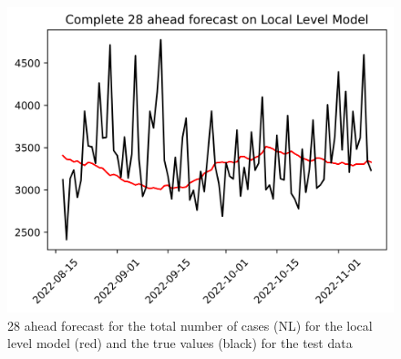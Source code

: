 \begin{figure}
\begin{minipage}{.32\textwidth}
  \label{fig:tot_cases_fc_7_mix_DE}
\end{minipage}
\begin{minipage}{.32\textwidth}
  \centering
  \includegraphics[width=\linewidth]{pics/28_ah/Complete_28_ahead_Local Level Model.png}
  \caption{28 ahead forecast for the total number of cases (NL) for the local level model (red) and the true values (black) for the test data}
  \label{fig:tot_cases_fc_28_LLM}
\end{minipage}

\end{figure}


